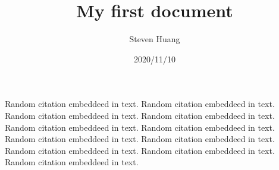 \documentclass[12pt]{article}
\title{ My first document}
\date{2020/11/10}
\author{Steven Huang}
\begin{document}
\maketitle
\newpage
{}

Random citation \cite{otsu1979threshold} embeddeed in text.
Random citation \cite{pedregosa2011scikit} embeddeed in text.
Random citation \cite{liu2006region} embeddeed in text.
Random citation \cite{mizushima2013image} embeddeed in text.
Random citation \cite{ray1999determination} embeddeed in text.
Random citation \cite{minaee2020image} embeddeed in text.
Random citation \cite{long2015fully} embeddeed in text.
Random citation \cite{noh2015learning} embeddeed in text.
Random citation \cite{badrinarayanan2017segnet} embeddeed in text.
Random citation \cite{ronneberger2015u} embeddeed in text.
Random citation \cite{milletari2016v} embeddeed in text.

\newpage
{}

  
%  
%
\end{document}
